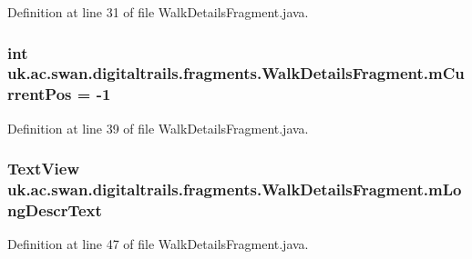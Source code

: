 Definition at line 31 of file Walk\+Details\+Fragment.\+java.

\hypertarget{classuk_1_1ac_1_1swan_1_1digitaltrails_1_1fragments_1_1_walk_details_fragment_ab621239845b9a219b0c977a988c3a931}{
\subsubsection[{m\+Current\+Pos}]{\setlength{\rightskip}{0pt plus 5cm}int uk.\+ac.\+swan.\+digitaltrails.\+fragments.\+Walk\+Details\+Fragment.\+m\+Current\+Pos = -\/1\hspace{0.3cm}{\ttfamily [protected]}}}\label{classuk_1_1ac_1_1swan_1_1digitaltrails_1_1fragments_1_1_walk_details_fragment_ab621239845b9a219b0c977a988c3a931}


Definition at line 39 of file Walk\+Details\+Fragment.\+java.

\hypertarget{classuk_1_1ac_1_1swan_1_1digitaltrails_1_1fragments_1_1_walk_details_fragment_ad3a7b2a803acadbc7fdaee19e0d72c81}{
\subsubsection[{m\+Long\+Descr\+Text}]{\setlength{\rightskip}{0pt plus 5cm}Text\+View uk.\+ac.\+swan.\+digitaltrails.\+fragments.\+Walk\+Details\+Fragment.\+m\+Long\+Descr\+Text\hspace{0.3cm}{\ttfamily [protected]}}}\label{classuk_1_1ac_1_1swan_1_1digitaltrails_1_1fragments_1_1_walk_details_fragment_ad3a7b2a803acadbc7fdaee19e0d72c81}


Definition at line 47 of file Walk\+Details\+Fragment.\+java.

